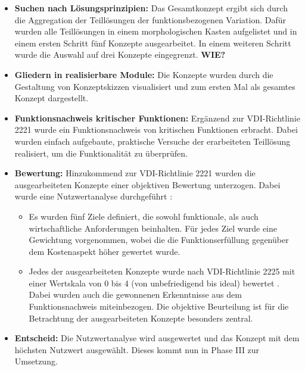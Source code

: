 \begin{itemize}
	\item \textbf{Suchen nach Lösungsprinzipien:} Das Gesamtkonzept ergibt sich durch die Aggregation der Teillösungen der funktionsbezogenen Variation. Dafür wurden alle Teillösungen in einem morphologischen Kasten aufgelistet und in einem ersten Schritt fünf Konzepte ausgearbeitet. In einem weiteren Schritt wurde die Auswahl auf drei Konzepte eingegrenzt. \textbf{WIE?}
	
	\item \textbf{Gliedern in realisierbare Module:} Die Konzepte wurden durch die Gestaltung von Konzeptskizzen visualisiert und zum ersten Mal als gesamtes Konzept dargestellt. 
	
	\item \textbf{Funktionsnachweis kritischer Funktionen:} Ergänzend zur VDI-Richtlinie 2221 wurde ein Funktionsnachweis von kritischen Funktionen erbracht. Dabei wurden einfach aufgebaute, praktische Versuche der erarbeiteten Teillösung realisiert, um die Funktionalität zu überprüfen.
	
	\item \textbf{Bewertung:} Hinzukommend zur VDI-Richtlinie 2221 wurden die ausgearbeiteten Konzepte einer objektiven Bewertung unterzogen. Dabei wurde eine Nutzwertanalyse durchgeführt \cite{pahl}:
	\begin{itemize}
		\item Es wurden fünf Ziele definiert, die sowohl funktionale, als auch wirtschaftliche Anforderungen beinhalten. Für jedes Ziel wurde eine Gewichtung vorgenommen, wobei die die Funktionserfüllung gegenüber dem Kostenaspekt höher gewertet wurde.
		
		\item Jedes der ausgearbeiteten Konzepte wurde nach VDI-Richtlinie 2225 mit einer Wertskala von 0 bis 4 (von unbefriedigend bis ideal) bewertet \cite{vdi2225}. Dabei wurden auch die gewonnenen Erkenntnisse aus dem Funktionsnachweis miteinbezogen. Die objektive Beurteilung ist für die Betrachtung der ausgearbeiteten Konzepte besonders zentral.
	\end{itemize}	
	
	\item \textbf{Entscheid:} Die Nutzwertanalyse wird ausgewertet und das Konzept mit dem höchsten Nutzwert ausgewählt. Dieses kommt nun in Phase III zur Umsetzung. 
\end{itemize}

